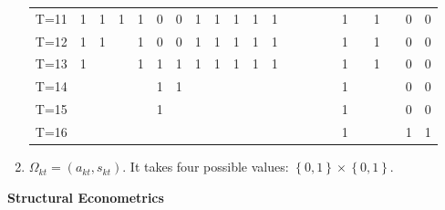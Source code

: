 \documentclass{article}
\begin{document}
\begin{enumerate}
\begin{table}[htbp]
\begin{tabular}{cccccccccccccccccccccc}
	T=11  & 1     & 1     & 1     & 1     & 0     & 0     & 1     & 1     & 1     & 1     & 1     &       &       &       &       & 1     &       & 1     &       & 0     & 0 \\
	T=12  & 1     & 1     &       & 1     & 0     & 0     & 1     & 1     & 1     & 1     & 1     &       &       &       &       & 1     &       & 1     &       & 0     & 0 \\
	T=13  & 1     &       &       & 1     & 1     & 1     & 1     & 1     & 1     & 1     & 1     &       &       &       &       & 1     &       & 1     &       & 0     & 0 \\
	T=14  &       &       &       &       & 1     & 1     &       &       &       &       &       &       &       &       &       & 1     &       &       &       & 0     & 0 \\
	T=15  &       &       &       &       & 1     &       &       &       &       &       &       &       &       &       &       & 1     &       &       &       & 0     & 0 \\
	T=16  &       &       &       &       &       &       &       &       &       &       &       &       &       &       &       & 1     &       &       &       & 1     & 1 \\
	\bottomrule
\end{tabular}%
	\label{tab:addlabel3}%
\end{table}%

\item $\Omega _{kt}=\left( a_{kt},s_{kt}\right) .$ It takes four possible
values: $\left\{ 0,1\right\} \times \left\{ 0,1\right\} .$



\end{enumerate}

\bigskip

\textbf{Structural Econometrics}
\end{document}
